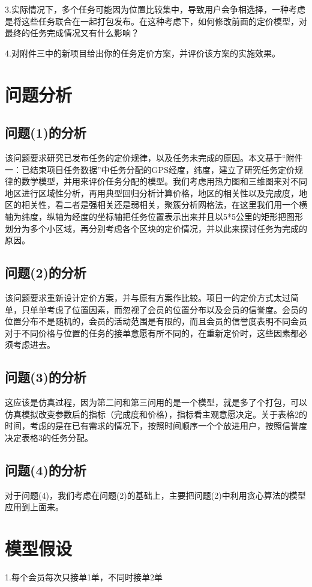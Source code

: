 \documentclass{ctexart}
\begin{document}
3.实际情况下，多个任务可能因为位置比较集中，导致用户会争相选择，一种考虑是将这些任务联合在一起打包发布。在这种考虑下，如何修改前面的定价模型，对最终的任务完成情况又有什么影响？

4.对附件三中的新项目给出你的任务定价方案，并评价该方案的实施效果。
\section{问题分析}
\subsection{问题(1)的分析}
该问题要求研究已发布任务的定价规律，以及任务未完成的原因。本文基于“附件一：已结束项目任务数据”中任务分配的GPS经度，纬度，建立了研究任务定价规律的数学模型，并用来评价任务分配的模型。我们考虑用热力图和三维图来对不同地区进行区域性分析，再用典型回归分析计算价格，地区的相关性以及完成度，地区的相关性，看二者是强相关还是弱相关，聚簇分析网格法，在这里我们用一个横轴为纬度，纵轴为经度的坐标轴把任务位置表示出来并且以5*5公里的矩形把图形划分为多个小区域，再分别考虑各个区块的定价情况，并以此来探讨任务为完成的原因。
\subsection{问题(2)的分析}
该问题要求重新设计定价方案，并与原有方案作比较。项目一的定价方式太过简单，只单单考虑了位置因素，而忽视了会员的位置分布以及会员的信誉度。会员的位置分布不是随机的，会员的活动范围是有限的，而且会员的信誉度表明不同会员对于不同价格与位置的任务的接单意愿有所不同的，在重新定价时，这些因素都必须考虑进去。
\subsection{问题(3)的分析}
这应该是仿真过程，因为第二问和第三问用的是一个模型，就是多了个打包，可以仿真模拟改变参数后的指标（完成度和价格），指标看主观意愿决定。关于表格2的时间，考虑的是在已有需求的情况下，按照时间顺序一个个放进用户，按照信誉度决定表格3的任务分配。
\subsection{问题(4)的分析}
对于问题(4)，我们考虑在问题(2)的基础上，主要把问题(2)中利用贪心算法的模型应用到上面来。
\section{模型假设}
1.每个会员每次只接单1单，不同时接单2单
\end{document}
